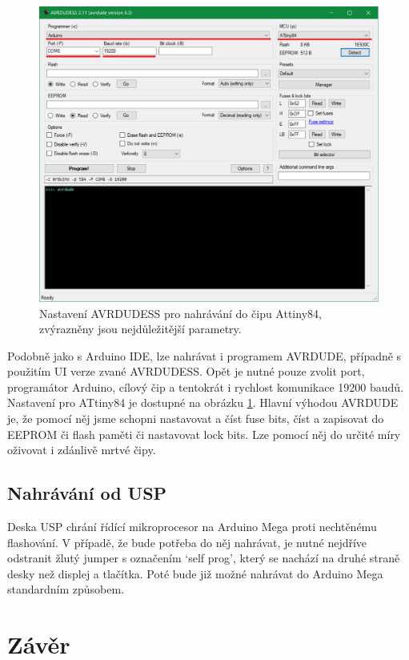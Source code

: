 \documentclass[11pt,a4paper,twoside,openright]{report}
\begin{document}
\begin{figure}[ht!]
  \includegraphics[width=\linewidth]{img/avrdude.png}
  \centering
  \caption{Nastavení AVRDUDESS pro nahrávání do čipu Attiny84, zvýrazněny jsou nejdůležitější parametry.}
  \label{fig:avrdude}
\end{figure}

Podobně jako s Arduino IDE, lze nahrávat i programem AVRDUDE, případně s použitím UI verze zvané AVRDUDESS. Opět je nutné pouze zvolit port, programátor Arduino, cílový čip a tentokrát i rychlost komunikace 19200 baudů. Nastavení pro ATtiny84 je dostupné na obrázku \ref{fig:avrdude}. Hlavní výhodou AVRDUDE je, že pomocí něj jsme schopni nastavovat a číst fuse bits, číst a zapisovat do EEPROM či flash paměti či nastavovat lock bits. Lze pomocí něj do určité míry oživovat i zdánlivě mrtvé čipy.

\section {Nahrávání od USP \label{selfupload}}

Deska USP chrání řídící mikroprocesor na Arduino Mega proti nechtěnému flashování. V případě, že bude potřeba do něj nahrávat, je nutné nejdříve odstranit žlutý jumper s označením \lq self prog\rq , který se nachází na druhé straně desky než displej a tlačítka. Poté bude již možné nahrávat do Arduino Mega standardním způsobem.

\chapter*{Závěr}
\pagestyle{empty}
\end{document}
